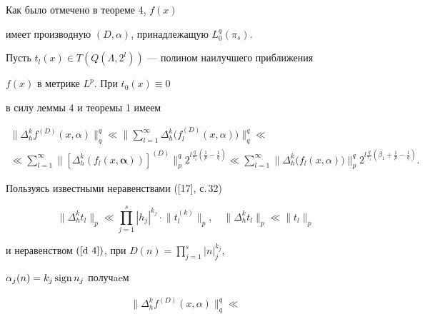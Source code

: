 \begin{pf}


Как было отмечено в теореме 4, $f(x)$ 


имеет производную $(D,\alpha)$, принадлежащую $L_0^q(\pi _s)$.





Пусть $t_l(x)\in T(Q(\Lambda,2^l))$ --- полином наилучшего приближения


$f(x)$ в метрике $L^p$. При $t_{0}(x)\equiv 0$


в силу леммы 4 и теоремы 1 имеем 


\begin{multline*}


\big\|\Delta^{ k}_{h} f^{(D)}(x,\alpha)


\big\|^q_q \ll \bigg\|\sum_{l=1}^\infty \Delta_{h}^{ k}


\big(f_l^{(D)}(x,\alpha)\big)\bigg\|^q_q \ll \\


%


\ll \sum_{l=1}^\infty \big\| [ \Delta^{k}_{h}(f_l


(x,{\boldsymbol{\alpha}}))]^{(D)}\big\|^q_p 


2^{l{\frac{q}{\tau_1}} ({\frac{1}{p}}-{\frac{1}{q}})} \ll 


\sum_{l=1}^\infty \big\| \Delta^k_{h}\big(f_l(x,\alpha)\big)


\big\|^q_p 2^{l{\frac{q}{\tau_1}} 


(\beta_1+{\frac{1}{p}}-{\frac{1}{q}})}.


\end{multline*}


Пользуясь известными неравенствами ([17], с.\,32)


$$


\big\| \Delta^{k}_{h} t_l\big\|_p \ll \prod_{j=1}^s


|h_j|^{k_j}\cdot \big\| t^{(k)}_l\big\|_p ,\quad 


\big\| \Delta^{k}_{h} t_l\big\|_p \ll \big\| t_l\big\|_p 


$$


и неравенством $(\ref {d 4})$, при $D(n)=\prod\limits_{j=1}^s |n|_j^{k_j}$,


${\alpha}_{j}(n)={k_j} \operatorname{sign} {n_j}$ получaeм


\begin{multline*}


\big\|\Delta^{ k}_{h} f^{(D)}(x, \alpha)\big\|_q^q \ll



\end{multline*}
\end{pf}
